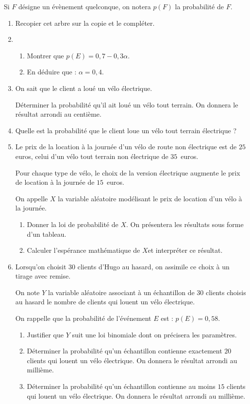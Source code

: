 Si $F$ désigne un évènement quelconque, on notera $p(F)$ la probabilité de $F$.

\begin{enumerate}
	\item Recopier cet arbre sur la copie et le compléter.
	\item 
	\begin{enumerate}
		\item Montrer que $p(E) = 0,7 - 0,3\alpha$.
		\item En déduire que : $\alpha = 0,4$.
	\end{enumerate}
	\item On sait que le client a loué un vélo électrique. 
	
	Déterminer la probabilité qu'il ait loué un vélo tout terrain. On donnera le résultat arrondi au centième.
	\item Quelle est la probabilité que le client loue un vélo tout terrain électrique ?
	\item Le prix de la location à la journée d'un vélo de route non électrique est de $25$ euros, celui d'un vélo tout terrain non électrique de $35$~euros. 
	
	Pour chaque type de vélo, le choix de la version électrique augmente le prix de location à la journée de $15$~euros. 
	
	On appelle $X$ la variable aléatoire modélisant le prix de location d'un vélo à la journée. 
	\begin{enumerate}
		\item Donner la loi de probabilité de $X$. On présentera les résultats sous forme d'un tableau.
		\item Calculer l'espérance mathématique de $X $et interpréter ce résultat.
	\end{enumerate}	
	\item Lorsqu'on choisit $30$ clients d'Hugo au hasard, on assimile ce choix à un tirage avec remise. 
	
	On note $Y$ la variable aléatoire associant à un échantillon de 30 clients choisis au hasard le nombre de clients qui louent un vélo électrique.
	
	On rappelle que la probabilité de l'événement $E$ est : $p(E) = 0,58$.
	\begin{enumerate}
		\item Justifier que $Y$ suit une loi binomiale dont on précisera les paramètres.
		\item Déterminer la probabilité qu'un échantillon contienne exactement $20$ clients qui louent un vélo électrique. On donnera le résultat arrondi au millième.
		\item Déterminer la probabilité qu'un échantillon contienne au moins $15$ clients qui louent un vélo électrique. On donnera le résultat arrondi au millième.
	\end{enumerate}
\end{enumerate}

